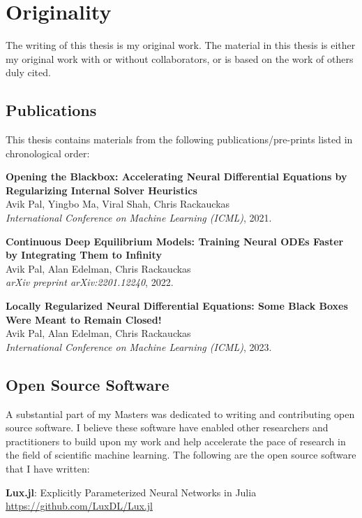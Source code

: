 \chapter*{Originality}

The writing of this thesis is my original work. The material in this thesis is either my original work with or without collaborators, or is based on the work of others duly cited.

\section*{Publications}

This thesis contains materials from the following publications/pre-prints listed in chronological order:

\textbf{Opening the Blackbox: Accelerating Neural Differential Equations by Regularizing Internal Solver Heuristics}\\
Avik Pal, Yingbo Ma, Viral Shah, Chris Rackauckas\\
\textit{International Conference on Machine Learning (ICML)}, 2021.

\textbf{Continuous Deep Equilibrium Models: Training Neural ODEs Faster by Integrating Them to Infinity}\\
Avik Pal, Alan Edelman, Chris Rackauckas\\
\textit{arXiv preprint arXiv:2201.12240}, 2022.

\textbf{Locally Regularized Neural Differential Equations: Some Black Boxes Were Meant to Remain Closed!}\\
Avik Pal, Alan Edelman, Chris Rackauckas\\
\textit{International Conference on Machine Learning (ICML)}, 2023.

\section*{Open Source Software}

A substantial part of my Masters was dedicated to writing and contributing open source software. I believe these software have enabled other researchers and practitioners to build upon my work and help accelerate the pace of research in the field of scientific machine learning. The following are the open source software that I have written:

\textbf{Lux.jl}: Explicitly Parameterized Neural Networks in Julia\\
{\small \url{https://github.com/LuxDL/Lux.jl}}

